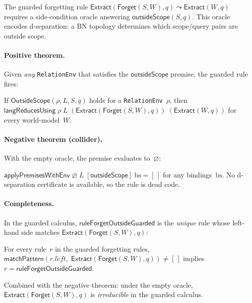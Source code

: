 \documentclass[11pt,openany]{report}
\begin{document}
The guarded forgetting rule
$\mathsf{Extract}(\mathsf{Forget}(S,W), q) \leadsto \mathsf{Extract}(W, q)$
requires a side-condition oracle answering $\mathsf{outsideScope}(S, q)$.
This oracle encodes d-separation: a BN topology determines which
scope/query pairs are outside scope.

\paragraph{Positive theorem.}
Given \emph{any} \texttt{RelationEnv} that satisfies the
$\mathsf{outsideScope}$ premise, the guarded rule fires:

\begin{theorem}
If $\mathsf{OutsideScope}(\rho, L, S, q)$ holds for a
\texttt{RelationEnv}~$\rho$, then
$\mathsf{langReducesUsing}\;\rho\;L\;
(\mathsf{Extract}(\mathsf{Forget}(S,W), q))\;
(\mathsf{Extract}(W, q))$
for every world-model~$W$.
\end{theorem}

\paragraph{Negative theorem (collider).}
With the empty oracle, the premise evaluates to~$\varnothing$:

\begin{theorem}
$\mathsf{applyPremisesWithEnv}\;\varnothing\;L\;
[\mathsf{outsideScope}]\;\mathrm{bs} = [\,]$
for any bindings~$\mathrm{bs}$.
No d-separation certificate is available, so the rule is dead code.
\end{theorem}

\paragraph{Completeness.}
In the guarded calculus, $\mathsf{ruleForgetOutsideGuarded}$ is the
\emph{unique} rule whose left-hand side matches
$\mathsf{Extract}(\mathsf{Forget}(S,W), q)$:

\begin{theorem}
For every rule~$r$ in the guarded forgetting rules,
$\mathsf{matchPattern}(r.\mathit{left},\;
\mathsf{Extract}(\mathsf{Forget}(S,W), q)) \ne [\,]$
implies $r = \mathsf{ruleForgetOutsideGuarded}$.
\end{theorem}

\noindent
Combined with the negative theorem: under the empty oracle,
$\mathsf{Extract}(\mathsf{Forget}(S,W), q)$ is \emph{irreducible} in
the guarded calculus.
\end{document}
